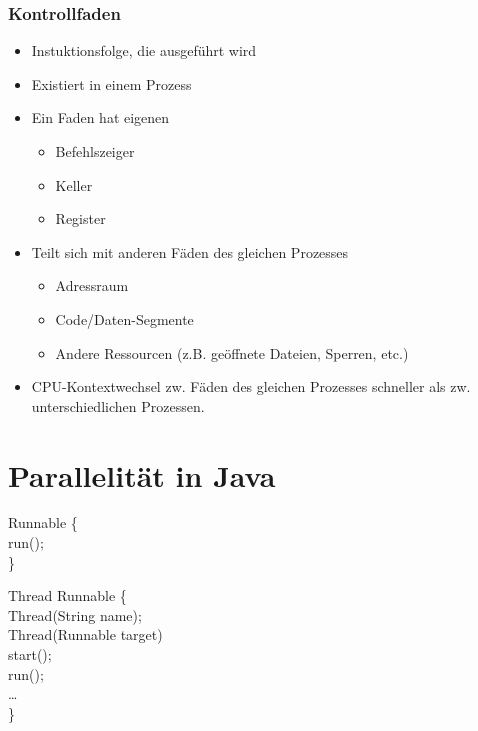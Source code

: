 \subsubsection{Kontrollfaden}
\begin{itemize}
    \item Instuktionsfolge, die ausgeführt wird
    \item Existiert in einem Prozess
    \item Ein Faden hat eigenen 
    \begin{itemize}
        \item Befehlszeiger
        \item Keller
        \item Register
    \end{itemize}
    \item Teilt sich mit anderen Fäden des gleichen Prozesses
    \begin{itemize}
        \item Adressraum
        \item Code/Daten-Segmente
        \item Andere Ressourcen (z.B. geöffnete Dateien, Sperren, etc.)
    \end{itemize}
    \item CPU-Kontextwechsel zw. Fäden des gleichen Prozesses schneller als zw. unterschiedlichen Prozessen.
\end{itemize}


\newpage
\section{Parallelität in Java}
    \begin{code}
        \javaPublic {}Runnable \{\\
        \null\quad\javaVoid run();\\
        \}\\
    \end{code}
    \begin{code}
        \javaPublic \javaClass Thread Runnable \{\\
        \null\quad\javaPublic Thread(String name);\\
        \null\quad\javaPublic Thread(Runnable target)\\
        \null\quad\javaPublic \javaVoid start();\\
        \null\quad\javaPublic \javaVoid run();\\
        \null\quad\dots\\
        \}\\
    \end{code}

